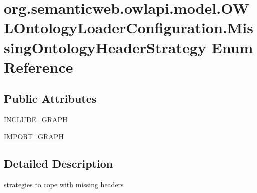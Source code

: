 \hypertarget{enumorg_1_1semanticweb_1_1owlapi_1_1model_1_1_o_w_l_ontology_loader_configuration_1_1_missing_ontology_header_strategy}{\section{org.\-semanticweb.\-owlapi.\-model.\-O\-W\-L\-Ontology\-Loader\-Configuration.\-Missing\-Ontology\-Header\-Strategy Enum Reference}
\label{enumorg_1_1semanticweb_1_1owlapi_1_1model_1_1_o_w_l_ontology_loader_configuration_1_1_missing_ontology_header_strategy}
}
\subsection*{Public Attributes}
\begin{DoxyCompactItemize}
\item 
\hyperlink{enumorg_1_1semanticweb_1_1owlapi_1_1model_1_1_o_w_l_ontology_loader_configuration_1_1_missing_ontology_header_strategy_a6af782628a906581b6eff3d61fde178c}{I\-N\-C\-L\-U\-D\-E\-\_\-\-G\-R\-A\-P\-H}
\item 
\hyperlink{enumorg_1_1semanticweb_1_1owlapi_1_1model_1_1_o_w_l_ontology_loader_configuration_1_1_missing_ontology_header_strategy_a52a046fb885013c88caae0baf383949a}{I\-M\-P\-O\-R\-T\-\_\-\-G\-R\-A\-P\-H}
\end{DoxyCompactItemize}


\subsection{Detailed Description}
strategies to cope with missing headers 

